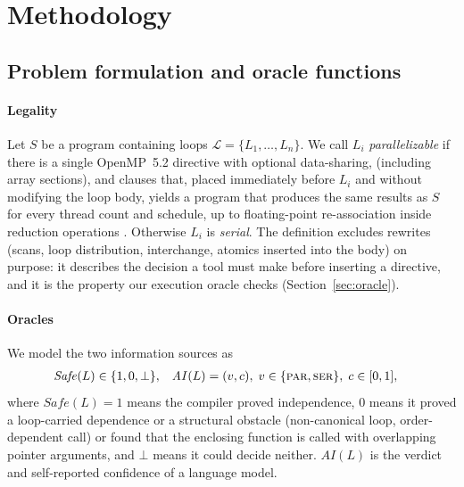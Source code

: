 \section{Methodology}
\label{sec:method}

\subsection{Problem formulation and oracle functions}
\label{sec:problem}

\paragraph{Legality} Let $S$ be a program containing loops $\mathcal{L}=\{L_1,\dots,L_n\}$. We call $L_i$ \emph{parallelizable} if there is a single OpenMP~5.2 directive  with optional data-sharing,  (including array sections),  and  clauses that, placed immediately before $L_i$ and without modifying the loop body, yields a program that produces the same results as $S$ for every thread count and schedule, up to floating-point re-association inside reduction operations \cite{openmp52}. Otherwise $L_i$ is \emph{serial}. The definition excludes rewrites (scans, loop distribution, interchange, atomics inserted into the body) on purpose: it describes the decision a tool must make before inserting a directive, and it is the property our execution oracle checks (Section~\ref{sec:oracle}).

\paragraph{Oracles} We model the two information sources as
\begin{align}
\mathit{Safe}(L) &\in \{1, 0, \bot\}, &
\mathit{AI}(L) &= (v, c),\; v \in \{\textsc{par},\textsc{ser}\},\; c\in[0,1],
\end{align}
where $\mathit{Safe}(L)=1$ means the compiler proved independence, $0$ means it proved a loop-carried dependence or a structural obstacle (non-canonical loop, order-dependent call) or found that the enclosing function is called with overlapping pointer arguments, and $\bot$ means it could decide neither. $\mathit{AI}(L)$ is the verdict and self-reported confidence of a language model.

